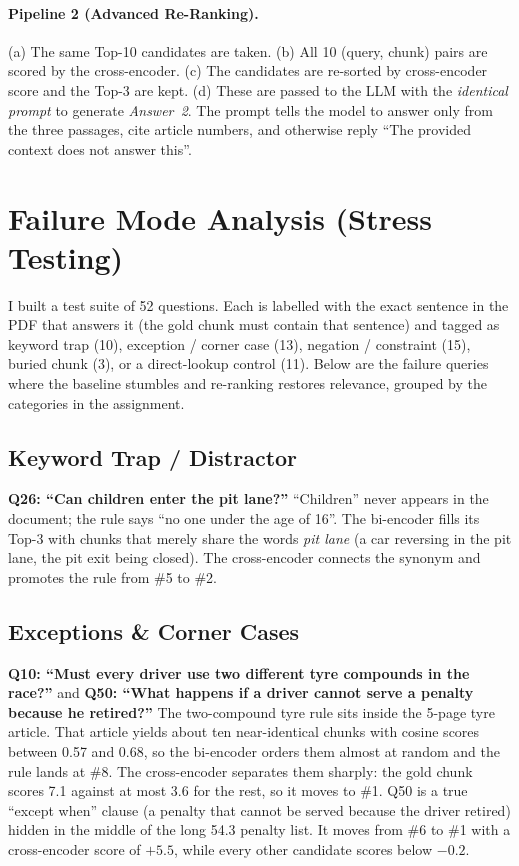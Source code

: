 \documentclass[11pt,a4paper]{article}
\begin{document}
\paragraph{Pipeline 2 (Advanced Re-Ranking).} (a) The same Top-10 candidates are taken. (b) All 10 (query, chunk)
pairs are scored by the cross-encoder. (c) The candidates are re-sorted by cross-encoder score and the Top-3 are
kept. (d) These are passed to the LLM with the \emph{identical prompt} to generate \emph{Answer~2}. The prompt tells
the model to answer only from the three passages, cite article numbers, and otherwise reply ``The provided context
does not answer this''.

\section{Failure Mode Analysis (Stress Testing)}

I built a test suite of 52 questions. Each is labelled with the exact sentence in the PDF that answers it (the gold
chunk must contain that sentence) and tagged as keyword trap (10), exception / corner case (13), negation /
constraint (15), buried chunk (3), or a direct-lookup control (11). Below are the failure queries where the
baseline stumbles and re-ranking restores relevance, grouped by the categories in the assignment.

\subsection{Keyword Trap / Distractor}
\textbf{Q26: ``Can children enter the pit lane?''} ``Children'' never appears in the document; the rule says ``no one under the age of
16''. The bi-encoder fills its Top-3 with chunks that merely share the words \emph{pit lane} (a car reversing in
the pit lane, the pit exit being closed). The cross-encoder connects the synonym and promotes the rule from \#5 to
\#2.

\subsection{Exceptions \& Corner Cases}
\textbf{Q10: ``Must every driver use two different tyre compounds in the race?''} and \textbf{Q50: ``What happens
if a driver cannot serve a penalty because he retired?''} The two-compound tyre rule sits inside the 5-page tyre article.
That article yields about ten near-identical chunks with cosine scores between 0.57 and 0.68, so the bi-encoder
orders them almost at random and the rule lands at \#8. The cross-encoder separates them sharply: the gold chunk
scores 7.1 against at most 3.6 for the rest, so it moves to \#1. Q50 is a true ``except when'' clause (a penalty
that cannot be served because the driver retired) hidden in the middle of the long 54.3 penalty list. It moves from
\#6 to \#1 with a cross-encoder score of $+5.5$, while every other candidate scores below $-0.2$.
\end{document}
